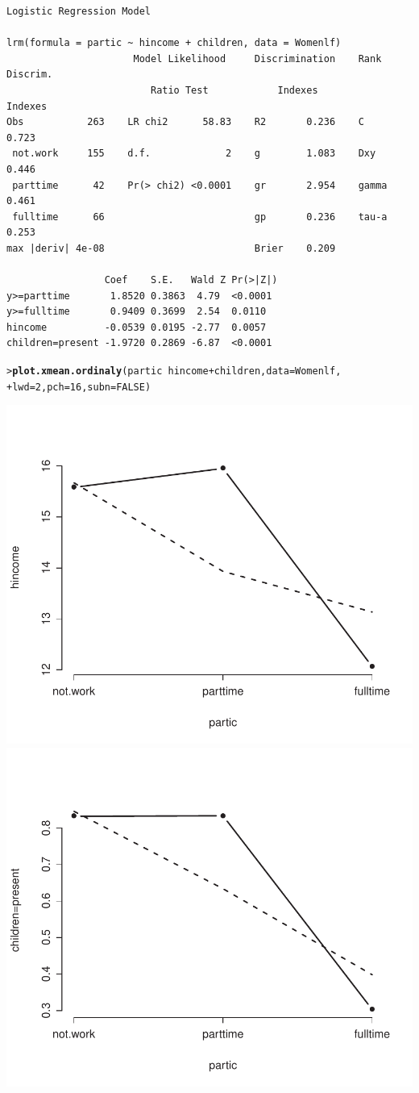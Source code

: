 \documentclass[10pt]{report}\usepackage[]{graphicx}\usepackage[]{color}
\makeatletter
\newcommand{\hlnum}[1]{\textcolor[rgb]{0.686,0.059,0.569}{#1}}%
\newcommand{\hlopt}[1]{\textcolor[rgb]{0,0,0}{#1}}%
\newcommand{\hlstd}[1]{\textcolor[rgb]{0.345,0.345,0.345}{#1}}%
\newcommand{\hlkwc}[1]{\textcolor[rgb]{0.333,0.667,0.333}{#1}}%
\newcommand{\hlkwd}[1]{\textcolor[rgb]{0.737,0.353,0.396}{\textbf{#1}}}%
\newenvironment{kframe}{%
 \def\at@end@of@kframe{}%
 \ifinner\ifhmode%
  \def\at@end@of@kframe{\end{minipage}}%
  \begin{minipage}{\columnwidth}%
 \fi\fi%
 \def\FrameCommand##1{\hskip\@totalleftmargin \hskip-\fboxsep
 \colorbox{shadecolor}{##1}\hskip-\fboxsep
     \hskip-\linewidth \hskip-\@totalleftmargin \hskip\columnwidth}%
 \MakeFramed {\advance\hsize-\width
   \@totalleftmargin\z@ \linewidth\hsize
   \@setminipage}}%
 {\par\unskip\endMakeFramed%
 \at@end@of@kframe}
\newenvironment{knitrout}{}{} %
\renewenvironment{knitrout}{\small\renewcommand{\baselinestretch}{.85}}{} %
\makeatother
\begin{document}
\begin{Exercises}
\begin{ans}
\begin{knitrout}
\begin{kframe}
\begin{verbatim}
Logistic Regression Model

lrm(formula = partic ~ hincome + children, data = Womenlf)
                      Model Likelihood     Discrimination    Rank Discrim.    
                         Ratio Test            Indexes          Indexes       
Obs           263    LR chi2      58.83    R2       0.236    C       0.723    
 not.work     155    d.f.             2    g        1.083    Dxy     0.446    
 parttime      42    Pr(> chi2) <0.0001    gr       2.954    gamma   0.461    
 fulltime      66                          gp       0.236    tau-a   0.253    
max |deriv| 4e-08                          Brier    0.209                     

                 Coef    S.E.   Wald Z Pr(>|Z|)
y>=parttime       1.8520 0.3863  4.79  <0.0001 
y>=fulltime       0.9409 0.3699  2.54  0.0110  
hincome          -0.0539 0.0195 -2.77  0.0057  
children=present -1.9720 0.2869 -6.87  <0.0001 
\end{verbatim}
\begin{alltt}
\hlstd{> }\hlkwd{plot.xmean.ordinaly}\hlstd{(partic} \hlopt{~} \hlstd{hincome} \hlopt{+} \hlstd{children,} \hlkwc{data} \hlstd{= Womenlf,}
\hlstd{+ }                    \hlkwc{lwd}\hlstd{=}\hlnum{2}\hlstd{,} \hlkwc{pch}\hlstd{=}\hlnum{16}\hlstd{,} \hlkwc{subn}\hlstd{=}\hlnum{FALSE}\hlstd{)}
\end{alltt}
\end{kframe}

\centerline{\includegraphics[width=.5\textwidth]{soln/fig/ex8_1a6-1} 
\includegraphics[width=.5\textwidth]{soln/fig/ex8_1a6-2} }




\end{knitrout}
\end{ans}
\end{Exercises}
\end{document}
